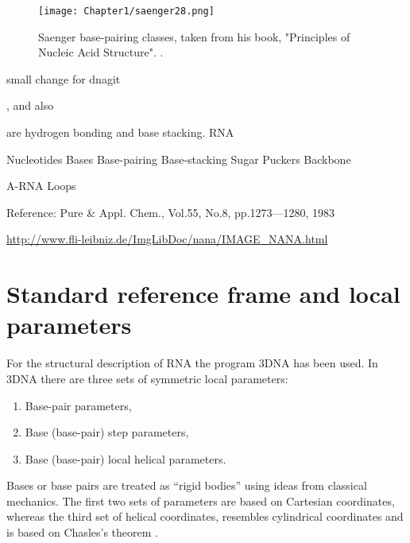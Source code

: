 \begin{figure}
\centering
\texttt{[image: Chapter1/saenger28.png]}
\caption{Saenger base-pairing classes, taken from his book, "Principles of
Nucleic Acid Structure". \cite{saenger1984}.}
\label{fig:saenger28}
\end{figure}  


small change for dnagit

, and also 

are hydrogen bonding and
base stacking. RNA 

Nucleotides
 Bases
  Base-pairing
  Base-stacking
Sugar
  Puckers
Backbone

A-RNA 
Loops

Reference:
Pure \& Appl. Chem., Vol.55, No.8, pp.1273—1280, 1983

\url{http://www.fli-leibniz.de/ImgLibDoc/nana/IMAGE_NANA.html}


\section{Standard reference frame and local parameters}
For  the  structural  description  of RNA  the  program  \textsf{3DNA}
\cite{lu2003} has been used.  In \textsf{3DNA} there are three sets of
symmetric local parameters:
\begin{enumerate}
\item Base-pair parameters,
\item Base (base-pair) step parameters,
\item Base (base-pair) local helical parameters.
\end{enumerate}
Bases or base  pairs are treated as ``rigid  bodies'' using ideas from
classical mechanics.
The first two  sets of parameters are based  on Cartesian coordinates,
whereas the  third set  of helical coordinates,  resembles cylindrical
coordinates and is based on Chasles's theorem \cite{babcock1994}.

